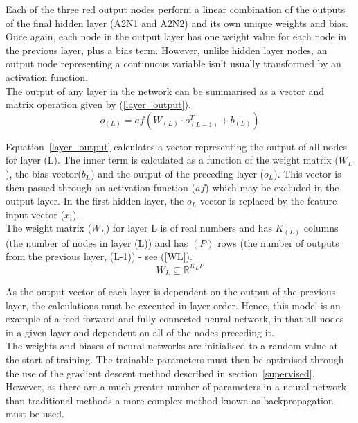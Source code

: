 \noindent
Each of the three red output nodes perform a linear combination of the outputs of the final hidden layer (A2N1 and A2N2) and its own unique weights and bias. Once again, each node in the output layer has one weight value for each node in the previous layer, plus a bias term. However, unlike hidden layer nodes, an output node representing a continuous variable isn't usually transformed by an activation function.
\\

\noindent 
The output of any layer in the network can be summarised as a vector and matrix operation given by (\ref{layer_output}). \\ 

\begin{equation} \label{layer_output}
	o_{(L)} = af(W_{(L)} \cdot o_{(L-1)}^T + b_{(L)})
\end{equation}

\noindent
Equation~\ref{layer_output} calculates a vector representing the output of all nodes for layer (L). The inner term is calculated as a function of the weight matrix ($W_{L}$), the bias vector($b_{L}$) and the output of the preceding layer ($o_{L}$). This vector is then passed through an activation function ($af$) which may be excluded in the output layer. In the first hidden layer, the $o_{L}$ vector is replaced by the feature input vector ($x_i$). \\

\noindent
The weight matrix ($W_{L}$) for layer {L} is of real numbers and has $K_{(L)}$ columns (the number of nodes in layer (L)) and has $(P)$ rows (the number of outputs from the previous layer, (L-1)) - see (\ref{WL}).
\\ 

\begin{equation} \label{WL}
	W_L \subseteq \mathbb{R}^{K_L P}
\end{equation}

\noindent
As the output vector of each layer is dependent on the output of the previous layer, the  calculations must be executed in layer order. Hence, this model is an example of a feed forward and fully connected neural network, in that all nodes in a given layer and dependent on all of the nodes preceding it. \\

\noindent
The weights and biases of neural networks are initialised to a random value at the start of training. The trainable parameters must then be optimised through the use of the gradient descent method described in section~\ref{supervised}. However, as there are a much greater number of parameters in a neural network than traditional methods a more complex method known as backpropagation \cite{hecht1992theory} must be used. \\

